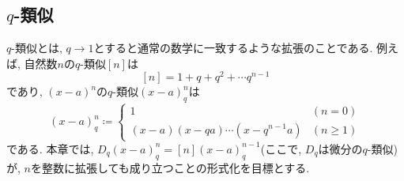 \documentclass[11pt]{jarticle}
\theoremstyle{mystyle}
\newcommand{\0}{\textbf{0}}
\newcommand{\1}{\textbf{1}}
\newcommand{\2}{\textbf{2}}
\begin{document}
\subsection{$q$-類似}
$q$-類似とは, $q \to 1$とすると通常の数学に一致するような拡張のことである. 例えば, 自然数$n$の$q$-類似$[n]$は
\[
  [n] = 1 + q + q^2 + \cdots q ^ {n -1} 
\]
であり, $(x-a)^n$の$q$-類似$(x-a)^n_q$は
\[
  (x-a)^n_q \coloneqq \begin{cases}
                                  1 & (n=0)\\
                                  (x-a)(x-qa)\cdots(x-q^{n-1}a) & (n\ge1)
                                \end{cases}
\]
である. 本章では, $D_q (x-a)^n_q = [n] (x-a)^{n-1}_q$(ここで, $D_q$は微分の$q$-類似)が, $n$を整数に拡張しても成り立つことの形式化を目標とする. 
\end{document}
